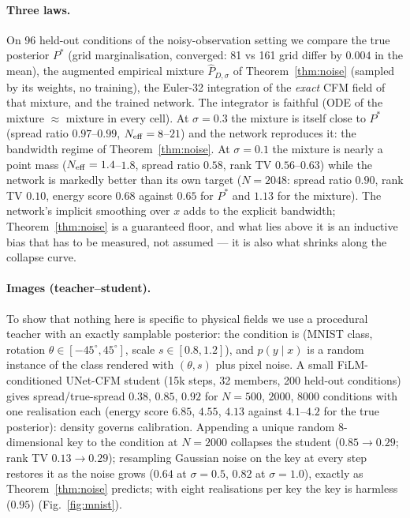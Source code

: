 \documentclass[11pt]{article}
\begin{document}
\paragraph{Three laws.} On 96 held-out conditions of the noisy-observation setting we compare the true posterior $P^\ast$ (grid marginalisation, converged: 81 vs 161 grid differ by $0.004$ in the mean), the augmented empirical mixture $\hat P_{D,\sigma}$ of Theorem~\ref{thm:noise} (sampled by its weights, no training), the Euler-32 integration of the \emph{exact} CFM field of that mixture, and the trained network. The integrator is faithful (ODE of the mixture $\approx$ mixture in every cell). At $\sigma=0.3$ the mixture is itself close to $P^\ast$ (spread ratio $0.97$--$0.99$, $N_{\rm eff}=8$--$21$) and the network reproduces it: the bandwidth regime of Theorem~\ref{thm:noise}. At $\sigma=0.1$ the mixture is nearly a point mass ($N_{\rm eff}=1.4$--$1.8$, spread ratio $0.58$, rank TV $0.56$--$0.63$) while the network is markedly better than its own target ($N=2048$: spread ratio $0.90$, rank TV $0.10$, energy score $0.68$ against $0.65$ for $P^\ast$ and $1.13$ for the mixture). The network's implicit smoothing over $x$ adds to the explicit bandwidth; Theorem~\ref{thm:noise} is a guaranteed floor, and what lies above it is an inductive bias that has to be measured, not assumed --- it is also what shrinks along the collapse curve.

\paragraph{Images (teacher--student).} To show that nothing here is specific to physical fields we use a procedural teacher with an exactly samplable posterior: the condition is (MNIST class, rotation $\theta\in[-45^\circ,45^\circ]$, scale $s\in[0.8,1.2]$), and $p(y\mid x)$ is a random instance of the class rendered with $(\theta,s)$ plus pixel noise. A small FiLM-conditioned UNet-CFM student (15k steps, 32 members, 200 held-out conditions) gives spread/true-spread $0.38$, $0.85$, $0.92$ for $N=500$, $2000$, $8000$ conditions with one realisation each (energy score $6.85$, $4.55$, $4.13$ against $4.1$--$4.2$ for the true posterior): density governs calibration. Appending a unique random 8-dimensional key to the condition at $N=2000$ collapses the student ($0.85\to0.29$; rank TV $0.13\to0.29$); resampling Gaussian noise on the key at every step restores it as the noise grows ($0.64$ at $\sigma=0.5$, $0.82$ at $\sigma=1.0$), exactly as Theorem~\ref{thm:noise} predicts; with eight realisations per key the key is harmless ($0.95$) (Fig.~\ref{fig:mnist}).
\end{document}

